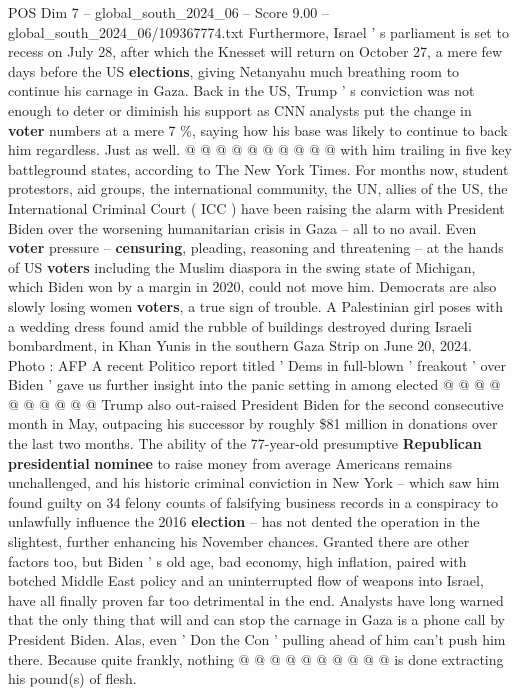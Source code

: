 \begin{textsample}{POS Dim 7 – global\_south\_2024\_06 – Score 9.00 – global\_south\_2024\_06/109367774.txt}
Furthermore, Israel ' s parliament is set to recess on July 28, after which the Knesset will return on October 27, a mere few days before the US \textbf{elections}, giving Netanyahu much breathing room to continue his carnage in Gaza.
Back in the US, Trump ' s conviction was not enough to deter or diminish his support as CNN analysts put the change in \textbf{voter} numbers at a mere 7 \%, saying how his base was likely to continue to back him regardless.
Just as well. @ @ @ @ @ @ @ @ @ @ with him trailing in five key battleground states, according to The New York Times.
For months now, student protestors, aid groups, the international community, the UN, allies of the US, the International Criminal Court ( ICC ) have been raising the alarm with President Biden over the worsening humanitarian crisis in Gaza -- all to no avail.
Even \textbf{voter} pressure -- \textbf{censuring}, pleading, reasoning and threatening -- at the hands of US \textbf{voters} including the Muslim diaspora in the swing state of Michigan, which Biden won by a margin in 2020, could not move him.
Democrats are also slowly losing women \textbf{voters}, a true sign of trouble.
A Palestinian girl poses with a wedding dress found amid the rubble of buildings destroyed during Israeli bombardment, in Khan Yunis in the southern Gaza Strip on June 20, 2024.
Photo : AFP A recent Politico report titled ' Dems in full-blown ' freakout ' over Biden ' gave us further insight into the panic setting in among elected @ @ @ @ @ @ @ @ @ @ Trump also out-raised President Biden for the second consecutive month in May, outpacing his successor by roughly \$81 million in donations over the last two months.
The ability of the 77-year-old presumptive \textbf{Republican} \textbf{presidential} \textbf{nominee} to raise money from average Americans remains unchallenged, and his historic criminal conviction in New York -- which saw him found guilty on 34 felony counts of falsifying business records in a conspiracy to unlawfully influence the 2016 \textbf{election} -- has not dented the operation in the slightest, further enhancing his November chances.
Granted there are other factors too, but Biden ' s old age, bad economy, high inflation, paired with botched Middle East policy and an uninterrupted flow of weapons into Israel, have all finally proven far too detrimental in the end.
Analysts have long warned that the only thing that will and can stop the carnage in Gaza is a phone call by President Biden.
Alas, even ' Don the Con ' pulling ahead of him can't push him there.
Because quite frankly, nothing @ @ @ @ @ @ @ @ @ @ is done extracting his pound(s) of flesh.

\end{textsample}
